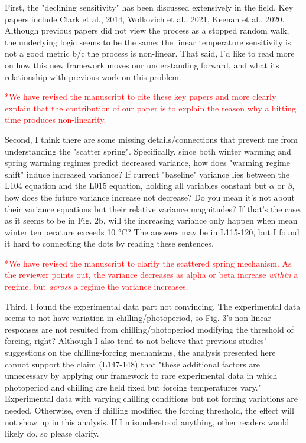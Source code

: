 \documentclass{article}
\begin{document}
First, the "declining sensitivity" has been discussed extensively in the field. Key papers include Clark et al., 2014, Wolkovich et al., 2021, Keenan et al., 2020. Although previous papers did not view the process as a stopped random walk, the underlying logic seems to be the same: the linear temperature sensitivity is not a good metric b/c the process is non-linear. That said, I'd like to read more on how this new framework moves our understanding forward, and what its relationship with previous work on this problem.

\textcolor{red}{*We have revised the manuscript to cite these key papers and more clearly explain that the contribution of our paper is to explain the reason why a hitting time produces non-linearity.}

Second, I think there are some missing details/connections that prevent me from understanding the "scatter spring". Specifically, since both winter warming and spring warming regimes predict decreased variance, how does "warming regime shift" induce increased variance? If current "baseline" variance lies between the L104 equation and the L015 equation, holding all variables constant but $\alpha$ or $\beta$, how does the future variance increase not decrease? Do you mean it's not about their variance equations but their relative variance magnitudes? If that's the case, as it seems to be in Fig. 2b, will the increasing variance only happen when mean winter temperature exceeds 10 °C? The answers may be in L115-120, but I found it hard to connecting the dots by reading these sentences.

\textcolor{red}{*We have revised the manuscript to clarify the scattered spring mechanism. As the reviewer points out, the variance decreases as alpha or beta increase \emph{within} a regime, but \emph{across} a regime the variance increases.}

Third, I found the experimental data part not convincing. The experimental data seems to not have variation in chilling/photoperiod, so Fig. 3's non-linear responses are not resulted from chilling/photoperiod modifying the threshold of forcing, right? Although I also tend to not believe that previous studies' suggestions on the chilling-forcing mechanisms, the analysis presented here cannot support the claim (L147-148) that "these additional factors are unnecessary by applying our framework to rare experimental data in which photoperiod and chilling are held fixed but forcing temperatures vary." Experimental data with varying chilling conditions but not forcing variations are needed. Otherwise, even if chilling modified the forcing threshold, the effect will not show up in this analysis. If I misunderstood anything, other readers would likely do, so please clarify.
\end{document}
